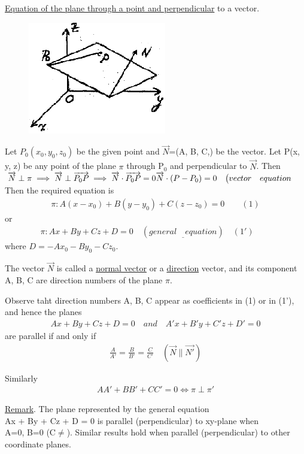 \documentclass{amsbook}
\begin{document}
\par\underline{Equation of the plane through a point and perpendicular} to a vector.
\begin{figure}
\includegraphics{images/B2P1-163.png}
\end{figure}
\par Let $P_{0}(x_{0},y_{0},z_{0})$ be the given point and $\overrightarrow{N}$=(A, B, C,) be the vector. Let P(x, y, z) be any point of the plane $\pi$ through P$_{0}$ and perpendicular to $\overrightarrow{N}$. Then\\
$
	\overrightarrow{N}\perp\pi
	\implies\overrightarrow{N}\perp\overrightarrow{P_{0}P}
	\implies\overrightarrow{N}\cdot\overrightarrow{P_{0}P}=0\\
	\overrightarrow{N}\cdot(P-P_{0})=0\quad\big(vector\quad equation
$\\
Then the required equation is
\begin{align*}
	\pi :A(x-x_{0})+B(y-y_{0})+C(z-z_{0})=0\qquad(1)
\end{align*}
or
\begin{align*}
	\pi:Ax+By+Cz+D=0\quad(\underline{general\quad equation})\quad(1')\qquad
\end{align*}
where $D=-Ax_{0}-By_{0}-Cz_{0}$.
\par The vector $\overrightarrow{N}$ is called a \underline{normal vector} or a \underline{direction} vector, and its component A, B, C are direction numbers of the plane $\pi$.
\par Observe taht direction numbers A, B, C appear as coefficients in (1) or in (1'), and hence the planes
\begin{align*}
	Ax+By+Cz+D=0\quad and \quad A'x+B'y+C'z+D'=0
\end{align*}
are parallel if and only if
\begin{align*}
	\frac{A}{A'}=\frac{B}{B'}=\frac{C}{C'}\quad(\overrightarrow{N}\parallel\overrightarrow{N'})
\end{align*}
\par Similarly
\begin{align*}
	AA'+BB'+CC'=0 \iff\pi\perp\pi'
\end{align*}
\par\underline{Remark}. The plane represented by the general equation\\Ax + By + Cz + D = 0 is parallel (perpendicular) to xy-plane when\\A=0, B=0 (C$\neq$). Similar results hold when parallel (perpendicular) to other coordinate planes.
\end{document}
